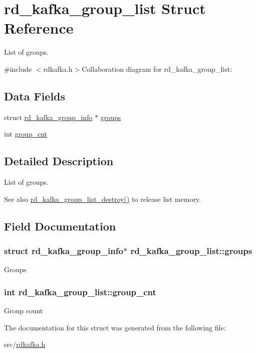 \hypertarget{structrd__kafka__group__list}{
\section{rd\_\-kafka\_\-group\_\-list Struct Reference}
\label{structrd__kafka__group__list}
}


List of groups.  


{\ttfamily \#include $<$rdkafka.h$>$}Collaboration diagram for rd\_\-kafka\_\-group\_\-list:\subsection*{Data Fields}
\begin{DoxyCompactItemize}
\item 
struct \hyperlink{structrd__kafka__group__info}{rd\_\-kafka\_\-group\_\-info} $\ast$ \hyperlink{structrd__kafka__group__list_afd1cba148fd1ba8ccdc7997046aac262}{groups}
\item 
int \hyperlink{structrd__kafka__group__list_a2313b523e013e33298a7298397f8dcf8}{group\_\-cnt}
\end{DoxyCompactItemize}


\subsection{Detailed Description}
List of groups. \begin{DoxySeeAlso}{See also}
\hyperlink{rdkafka_8h_ab28e1cb749e7e62168107ccdee1960ea}{rd\_\-kafka\_\-group\_\-list\_\-destroy()} to release list memory. 
\end{DoxySeeAlso}


\subsection{Field Documentation}
\hypertarget{structrd__kafka__group__list_afd1cba148fd1ba8ccdc7997046aac262}{
\subsubsection[{groups}]{\setlength{\rightskip}{0pt plus 5cm}struct {\bf rd\_\-kafka\_\-group\_\-info}$\ast$ {\bf rd\_\-kafka\_\-group\_\-list::groups}}}
\label{structrd__kafka__group__list_afd1cba148fd1ba8ccdc7997046aac262}
Groups \hypertarget{structrd__kafka__group__list_a2313b523e013e33298a7298397f8dcf8}{
\subsubsection[{group\_\-cnt}]{\setlength{\rightskip}{0pt plus 5cm}int {\bf rd\_\-kafka\_\-group\_\-list::group\_\-cnt}}}
\label{structrd__kafka__group__list_a2313b523e013e33298a7298397f8dcf8}
Group count 

The documentation for this struct was generated from the following file:\begin{DoxyCompactItemize}
\item 
src/\hyperlink{rdkafka_8h}{rdkafka.h}\end{DoxyCompactItemize}
